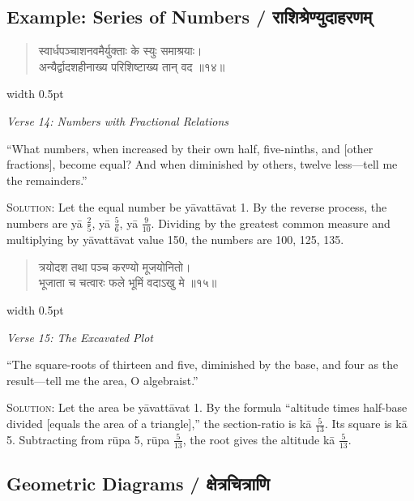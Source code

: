 \documentclass[11pt,a4paper]{article}
\newcommand{\vs}{\vspace{0.5em}}
\newenvironment{sanskritverse}{%
  \begin{quote}\devanagarifont\textcolor{versecolor}%
}{%
  \end{quote}
}
\newcommand{\bilingual}[2]{%
  \par\vspace{0.5em}%
  \noindent\begin{minipage}[t]{0.47\textwidth}%
  \setlength{\parindent}{0pt}%
  \small #1%
  \end{minipage}%
  \hfill\textcolor{columnrule}{\vrule width 0.5pt}\hfill%
  \begin{minipage}[t]{0.47\textwidth}%
  \setlength{\parindent}{0pt}%
  \small\raggedright #2%
  \end{minipage}%
  \par\vspace{0.5em}%
}
\begin{document}
\newpage

\subsection*{Example: Series of Numbers / राशिश्रेण्युदाहरणम्}

\bilingual{\begin{sanskritverse}
स्वार्धपञ्चाशनवमैर्युक्ताः के स्युः समाश्रयाः।\\
अन्यैर्द्वादशहीनाख्य परिशिष्टाख्य तान् वद ॥१४॥
\end{sanskritverse}
}{%
\begin{flushright}
\textit{Verse 14: Numbers with Fractional Relations}
\end{flushright}
``What numbers, when increased by their own half, five-ninths, and [other fractions], become equal? And when diminished by others, twelve less---tell me the remainders.''

\vs
\textsc{Solution:} Let the equal number be y\={a}vatt\={a}vat 1. By the reverse process, the numbers are y\={a} $\frac{2}{5}$, y\={a} $\frac{5}{6}$, y\={a} $\frac{9}{10}$. Dividing by the greatest common measure and multiplying by y\={a}vatt\={a}vat value 150, the numbers are 100, 125, 135.}

\vs

\bilingual{\begin{sanskritverse}
त्रयोदश तथा पञ्च करण्यो मूजयोनितो।\\
भूजाता च चत्वारः फले भूमिं वदाऽखु मे ॥१५॥
\end{sanskritverse}
}{%
\begin{flushright}
\textit{Verse 15: The Excavated Plot}
\end{flushright}
``The square-roots of thirteen and five, diminished by the base, and four as the result---tell me the area, O algebraist.''

\vs
\textsc{Solution:} Let the area be y\={a}vatt\={a}vat 1. By the formula ``altitude times half-base divided [equals the area of a triangle],'' the section-ratio is k\={a} $\frac{5}{13}$. Its square is k\={a} 5. Subtracting from r\={u}pa 5, r\={u}pa $\frac{5}{13}$, the root gives the altitude k\={a} $\frac{5}{13}$.}

\newpage

\subsection*{Geometric Diagrams / क्षेत्रचित्राणि}
\end{document}

